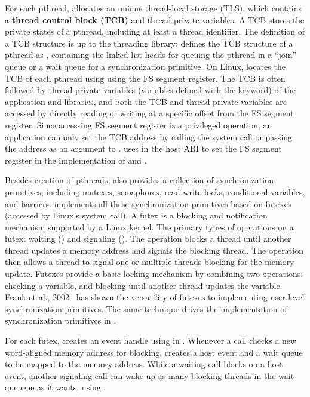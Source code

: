 For each pthread, \libpthread{} allocates an unique thread-local storage (TLS), which contains a {\bf thread control block (TCB)} and thread-private variables.
A TCB stores the private states of a pthread, including at least a thread identifier.
The definition of a TCB structure is up to the threading library;
\libpthread{} defines the TCB structure of a pthread as ,
containing the linked list heads for queuing the pthread
in a ``join'' queue or a wait queue for a synchronization primitive.
On \graphenearch{} Linux, \libpthread{}
locates the TCB of each pthread using using the FS segment register.
The TCB is often
followed by thread-private variables (variables defined with the  keyword) of the application
and libraries,
and both the TCB and thread-private variables
are accessed by directly reading or writing at a specific offset from the FS segment register.
Since accessing FS segment register is a privileged operation,
an application can only set the TCB address
by calling the  system call or passing the address as an argument to .
\thelibos{} uses  in the host ABI
to set the FS segment register
in the implementation of  and .


Besides creation of pthreads, \libpthread{} also provides a collection of synchronization primitives, including mutexes, semaphores, read-write locks, conditional variables, and barriers.
\libpthread{} implements all these synchronization primitives based on futexes (accessed by Linux's  system call). %
A futex is a blocking and notification mechanism
supported by a Linux kernel.
The primary types of operations on a futex: 
waiting () and signaling ().
The  operation
blocks a thread until another thread updates a memory address
and signals the blocking thread.
The  operation then allows a thread
to signal one or multiple threads blocking for the memory update.
Futexes provide a basic locking mechanism
by combining two operations: checking a variable, and blocking until
another thread updates the variable.
Frank et al., 2002~\cite{franke02futex} has shown the versatility of futexes
to implementing user-level synchronization primitives. The same technique drives the implementation of synchronization primitives in \libpthread{}.


For each futex, \thelibos{} creates an event handle using  in \thehostabi{}.
Whenever a  call checks a new word-aligned memory address for blocking, \thelibos{} creates a host event and a wait queue to be mapped to the memory address.
While a waiting  call blocks on a host event,
another signaling  call can wake up as many blocking threads in the wait queueue as it wants, using .


